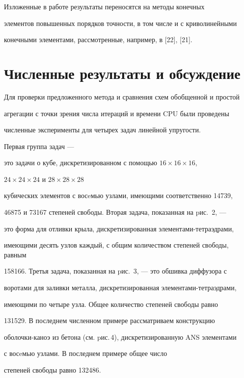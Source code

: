Изложенные в работе результаты переносятся на методы конечных


элементов повышенных порядков точности, в том числе и с криволинейными


конечными элементами, рассмотренные, например, в [22], [21].





\section{Численные результаты и обсуждение}





Для проверки предложенного метода и сравнения схем обобщенной и простой


агрегации с точки зрения числа итераций и времени CPU были проведены


численные эксперименты для четырех задач линейной упругости.





\hskip 6.4cm


\parbox{10cm}{\parindent=6mm Первая группа задач ---


это задачи о кубе, дискретизированном с помощью $16\times 16\times 16$,


$24\times 24\times 24$ и $28\times 28\times 28$


кубических элементов с восeмью узлами, имеющими соответственно 14739,


46875 и 73167 степеней свободы. Вторая задача, показанная на pис.~2, ---


это форма для отливки крыла, дискретизированная элементами-тетраэдрами,


имеющими десять узлов каждый, с общим количеством степеней свободы, равным


158166. Третья задача, показанная на pис.~3, --- это обшивка диффузора с


воротами для заливки металла, дискретизированная элементами-тетраэдрами,


имеющими по четыре узла. Общее количество степеней свободы равно


131529. В последнем численном примере рассматриваем конструкцию


оболочки-каноэ из бетона (см. pис.\,4), дискретизированную ANS элементами


с восeмью узлами. В последнем примере общее число


степеней свободы равно 132486.}


